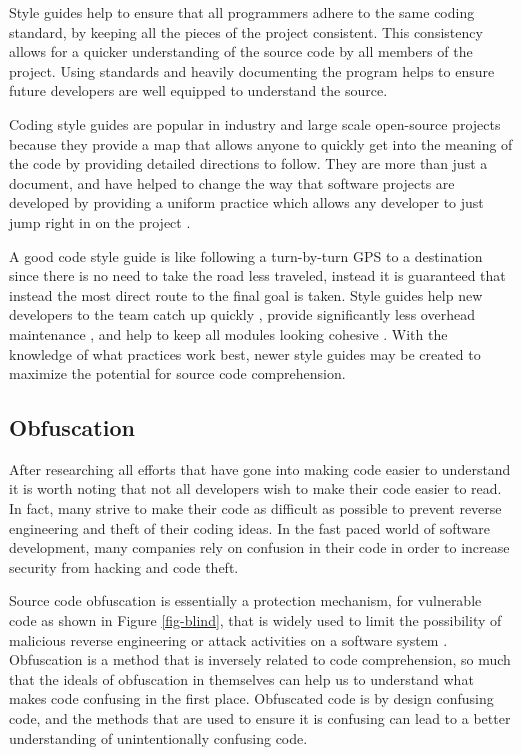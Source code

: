 Style guides help to ensure that all programmers adhere to the same coding standard, by keeping all the pieces 
of the project consistent. This consistency allows for a quicker understanding of the source code by
all members of the project. Using standards and heavily documenting the program helps to ensure future developers are well equipped to understand the source.

Coding style guides are popular in industry and large scale open-source projects 
\cite{google_google_2011,weinberger_google_2011,doland_c_1994,torvalds_linux_nodate, van_rossum_pythonstyle-pep_2001} because they provide a map that 
allows anyone to quickly get into the meaning of the code by providing detailed directions to follow. They are more 
than just a document, and have helped to change the way that software projects are developed by providing
a uniform practice which allows any developer to just jump right in on the project
\cite{gale_collaborative_1996}.

A good code style guide is like following a turn-by-turn GPS to a destination since
there is no need to take the road less traveled, instead it is guaranteed that instead the most direct route to the final goal is taken. Style guides help new 
developers to the team catch up quickly \cite{google_google_2011}, provide significantly less overhead maintenance \cite{torvalds_linux_nodate}, and help to keep all 
modules looking cohesive \cite{doland_c_1994}. With the knowledge of what practices work best, newer style guides may be created to maximize the potential for source code comprehension.


\subsection{Obfuscation}
After researching all efforts that have gone into making code easier to understand it is worth noting that not all developers wish to make their code easier to read. In fact, many strive to make their code as
difficult as possible to prevent reverse engineering and theft of their coding ideas. In the fast
paced world of software development, many companies rely on confusion in their code in order to increase security from hacking and code theft. 

Source code obfuscation is essentially a protection mechanism, for vulnerable code as shown in Figure \ref{fig-blind}, that is widely used to limit the possibility of malicious reverse
engineering or attack activities on a software system \cite{ceccato_effectiveness_2009}.
Obfuscation is a method that is inversely related to code comprehension, so much that the ideals of
obfuscation in themselves can help us to understand what makes code confusing in the first place.  
Obfuscated code is by design confusing code, and the methods that are used to ensure it is confusing
can lead to a better understanding of unintentionally confusing code.

